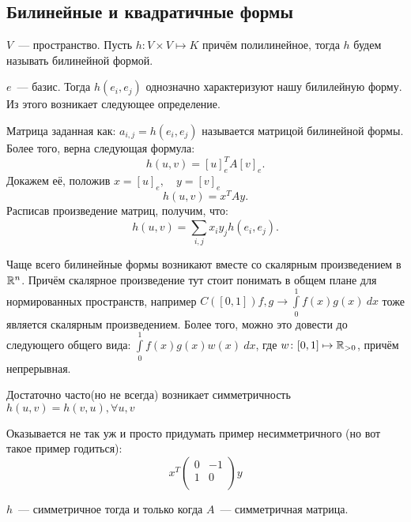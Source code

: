\subsection{Билинейные и квадратичные формы}
\begin{definition}
    $V$~--- пространство.
    Пусть $h\colon V \times V \mapsto K$ причём полилинейное, тогда $h$ будем называть
    билинейной формой.
\end{definition}
\begin{remark}
    $e$~--- базис.
    Тогда $h(e_i, e_j)$ однозначно характеризуют нашу билилейную форму.
    Из этого возникает следующее определение.
\end{remark}
\begin{definition}
    Матрица заданная как: $a_{i,j} = h(e_i, e_j)$ называется матрицой билинейной формы.
    Более того, верна следующая формула:
    \[
        h(u, v) = [u]^T_eA[v]_e
    .\] 
    Докажем её, положив $x = [u]_e,\quad y = [v]_e$
     \[
        h(u, v) = x^T A y
    .\] 
    Расписав произведение матриц, получим, что:
    \[
        h(u, v) = \sum\limits_{i, j}^{}{x_i y_j h(e_i, e_j)}
    .\] 
\end{definition}
\begin{motivation}
    Чаще всего билинейные формы возникают вместе со скалярным произведением 
    в $\mathbb{R}^n$. Причём скалярное произведение тут стоит понимать в общем плане для
    нормированных пространств, например $C\left([0, 1]\right) f, g \rightarrow \int\limits_{0}^{1}{f(x)g(x)\ dx}$
    тоже является скалярным произведением. Более того, можно это довести до следующего
    общего вида:
    $\int\limits_{0}^{1}{f(x)g(x) w(x)\ dx}$, где $w\colon [0, 1]\mapsto \mathbb{R}_{> 0}$,
    причём непрерывная.
\end{motivation}
\begin{definition}
    \item Достаточно часто(но не всегда) возникает симметричность
        $h(u,v) = h(v,u), \forall u,v$ 
\end{definition}
\begin{remark}
    Оказывается не так уж и просто придумать пример несимметричного
    (но вот такое пример годиться):
    \[
        x^T
        \begin{pmatrix}
            0 & -1\\
            1 & 0\\
        \end{pmatrix} y
    \]
\end{remark}
\begin{remark}
    $h$~--- симметричное тогда и только когда $A$~--- симметричная матрица.
\end{remark}
